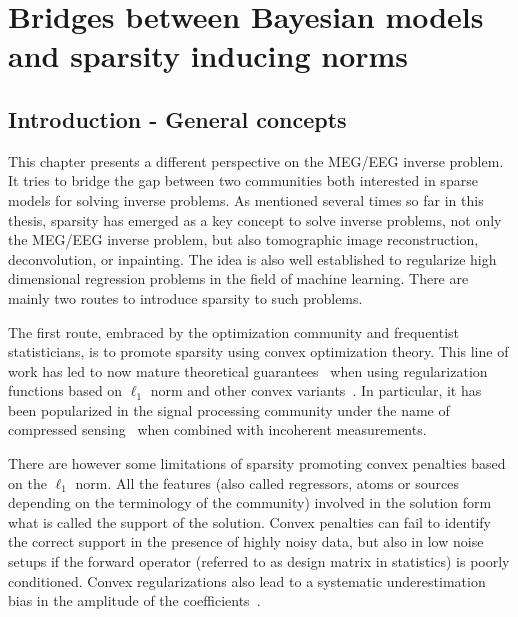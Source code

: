 
\chapter{Bridges between Bayesian models and sparsity inducing norms}
\label{chapter:bayesian}
\noindent\makebox[\linewidth]{\rule{0.75\paperwidth}{0.4pt}}
\noindent\makebox[\linewidth]{\rule{0.75\paperwidth}{0.4pt}}

\localtableofcontents %

\noindent\makebox[\linewidth]{\rule{0.75\paperwidth}{0.4pt}}
\noindent\makebox[\linewidth]{\rule{0.75\paperwidth}{0.4pt}}

\newpage

\section{Introduction - General concepts}
\label{sec:bayes_intro}

This chapter presents a different perspective on the MEG/EEG inverse problem. It tries to bridge the gap between two communities both interested in sparse models for solving inverse problems. As mentioned several times so far in this thesis, sparsity has emerged as a key concept to solve inverse problems, not only the MEG/EEG inverse problem, but also tomographic image reconstruction, deconvolution, or inpainting. The idea is also well established to regularize high dimensional regression problems in the field of machine learning. There are mainly two routes to introduce sparsity to such problems.

The first route, embraced by the optimization community and frequentist
statisticians, is to promote sparsity using convex optimization theory.
This line of work has led to now mature theoretical guarantees~\cite{FoRa13} when using regularization functions based on $\ell_1$ norm and other convex variants~\cite{Tibshirani96}. In particular, it has been popularized in the signal processing community under the name of compressed sensing~\cite{candes2008introduction} when combined with incoherent measurements.

There are however some limitations of sparsity promoting convex penalties based on the $\ell_1$ norm.
All the features (also called regressors, atoms or sources depending on the terminology of the community) involved in the solution form what is called the support of the solution.
Convex penalties can fail to identify the correct support in the presence of highly noisy data, but also in low noise setups if the forward operator (referred to as design matrix in statistics) is poorly conditioned. Convex regularizations also lead to a systematic underestimation bias in the amplitude of the coefficients~\cite{OsBuGoXuYi06,Candes,chartrand2007exact,saab2008stable,ChHeSa17}.

